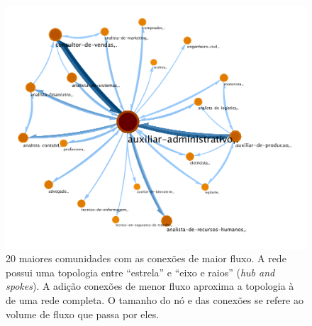 \documentclass[
  article,
  11pt,
  a4paper,
  english,
  brazil,
  sumario=tradicional]{abntex2}
\begin{document}
\begin{figure}[ht]
  \centering
  \includegraphics[width=0.9\linewidth]{ex-sobreposicao.pdf}
  \caption{20 maiores comunidades com as conexões de maior fluxo. A rede possui uma topologia entre \enquote{estrela} e \enquote{eixo e raios} (\textit{hub and spokes}). A adição conexões de menor fluxo aproxima a topologia à de uma rede completa.  O tamanho do nó e das conexões se refere ao volume de fluxo que passa por eles.}
  \label{fig:ex-sobreposicao}
\end{figure}
\end{document}
